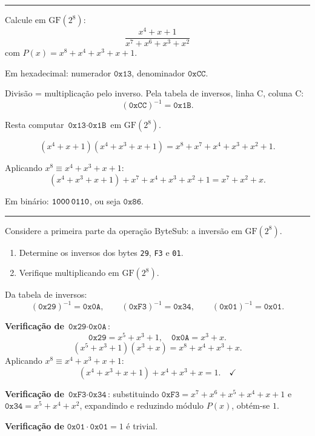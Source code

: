 \documentclass[12pt,a4paper]{article}
\newcommand{\exercicio}[1]{%
    \par\vspace{1.2em}
    \noindent
    {\color{black!55}\rule[-0.25em]{3pt}{1.6em}}%
    \hspace{0.6em}{\Large\bfseries Exerc\'{i}cio #1}
    \par\vspace{-0.4em}
    \noindent{\color{black!35}\rule{\textwidth}{0.4pt}}
    \par\vspace{0.35em}
}
\newenvironment{resposta}{%
    \begin{respostabox}
    \color{red!70!black}\sloppy
}{%
    \end{respostabox}
}
\begin{document}
\exercicio{3}
Calcule em $\mathrm{GF}(2^8)$:
\[
\frac{x^4 + x + 1}{x^7 + x^6 + x^3 + x^2}
\]
com $P(x) = x^8 + x^4 + x^3 + x + 1$.

\begin{resposta}

Em hexadecimal: numerador $\texttt{0x13}$, denominador $\texttt{0xCC}$.

Divisão = multiplicação pelo inverso. Pela tabela de inversos, linha $\mathrm{C}$, coluna $\mathrm{C}$:
\[
(\texttt{0xCC})^{-1} = \texttt{0x1B}.
\]

Resta computar $\texttt{0x13} \cdot \texttt{0x1B}$ em $\mathrm{GF}(2^8)$.

\[
(x^4 + x + 1)(x^4 + x^3 + x + 1) = x^8 + x^7 + x^4 + x^3 + x^2 + 1.
\]

Aplicando $x^8 \equiv x^4 + x^3 + x + 1$:
\[
(x^4 + x^3 + x + 1) + x^7 + x^4 + x^3 + x^2 + 1 = x^7 + x^2 + x.
\]

Em binário: $\texttt{1000\,0110}$, ou seja $\boxed{\texttt{0x86}}$.

\end{resposta}

\exercicio{4}
Considere a primeira parte da operação ByteSub: a inversão em $\mathrm{GF}(2^8)$.

\begin{enumerate}[label=\arabic*.]
    \item Determine os inversos dos bytes \texttt{29}, \texttt{F3} e \texttt{01}.
    \item Verifique multiplicando em $\mathrm{GF}(2^8)$.
\end{enumerate}

\begin{resposta}

Da tabela de inversos:
\[
(\texttt{0x29})^{-1} = \texttt{0x0A}, \qquad
(\texttt{0xF3})^{-1} = \texttt{0x34}, \qquad
(\texttt{0x01})^{-1} = \texttt{0x01}.
\]

\textbf{Verificação de} $\texttt{0x29} \cdot \texttt{0x0A}$:
\[
\texttt{0x29} = x^5 + x^3 + 1, \quad \texttt{0x0A} = x^3 + x.
\]
\[
(x^5+x^3+1)(x^3+x) = x^8 + x^4 + x^3 + x.
\]
Aplicando $x^8 \equiv x^4 + x^3 + x + 1$:
\[
(x^4+x^3+x+1) + x^4 + x^3 + x = 1. \quad \checkmark
\]

\textbf{Verificação de} $\texttt{0xF3} \cdot \texttt{0x34}$: substituindo $\texttt{0xF3} = x^7+x^6+x^5+x^4+x+1$ e $\texttt{0x34} = x^5+x^4+x^2$, expandindo e reduzindo módulo $P(x)$, obtém-se $1$.

\textbf{Verificação de} $\texttt{0x01} \cdot \texttt{0x01} = 1$ é trivial.

\end{resposta}
\end{document}
